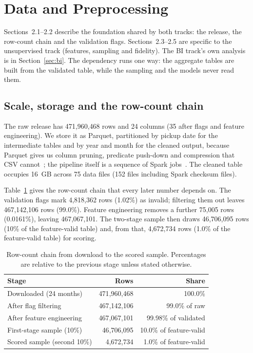 \documentclass[11pt,a4paper]{article}
\begin{document}
\section{Data and Preprocessing}
\label{sec:data}

Sections~2.1--2.2 describe the foundation shared by both tracks: the release, the row-count chain and the validation flags. Sections~2.3--2.5 are specific to the unsupervised track (features, sampling and fidelity). The BI track's own analysis is in Section~\ref{sec:bi}. The dependency runs one way: the aggregate tables are built from the validated table, while the sampling and the models never read them.

\subsection{Scale, storage and the row-count chain}

The raw release has 471{,}960{,}468 rows and 24 columns (35 after flags and feature engineering). We store it as Parquet, partitioned by pickup date for the intermediate tables and by year and month for the cleaned output, because Parquet gives us column pruning, predicate push-down and compression that CSV cannot~\cite{parquet}; the pipeline itself is a sequence of Spark jobs~\cite{spark}. The cleaned table occupies 16~GB across 75 data files (152 files including Spark checksum files).

Table~\ref{tab:chain} gives the row-count chain that every later number depends on. The validation flags mark 4{,}818{,}362 rows (1.02\%) as invalid; filtering them out leaves 467{,}142{,}106 rows (99.0\%). Feature engineering removes a further 75{,}005 rows (0.0161\%), leaving 467{,}067{,}101. The two-stage sample then draws 46{,}706{,}095 rows (10\% of the feature-valid table) and, from that, 4{,}672{,}734 rows (1.0\% of the feature-valid table) for scoring.

\begin{table}[t]
\centering
\small
\caption{Row-count chain from download to the scored sample. Percentages are relative to the previous stage unless stated otherwise.}
\label{tab:chain}
\begin{tabular}{lrr}
\toprule
Stage & Rows & Share \\
\midrule
Downloaded (24 months) & 471{,}960{,}468 & 100.0\% \\
After flag filtering & 467{,}142{,}106 & 99.0\% of raw \\
After feature engineering & 467{,}067{,}101 & 99.98\% of validated \\
First-stage sample (10\%) & 46{,}706{,}095 & 10.0\% of feature-valid \\
Scored sample (second 10\%) & 4{,}672{,}734 & 1.0\% of feature-valid \\
\bottomrule
\end{tabular}
\end{table}
\end{document}
